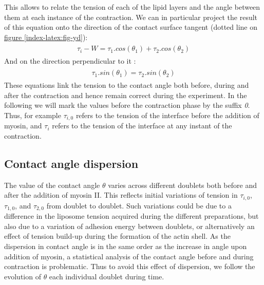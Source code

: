 \documentclass[A4paperpaper,11pt,english]{sphinxmanual}
\begin{document}
This allows
to relate the tension of each of the lipid layers and the angle
between them at each instance of the contraction. We can in particular project
the result of this equation onto the direction of the contact surface
tangent (dotted line on \hyperref[index-latex:fig-yd]{figure  \ref*{index-latex:fig-yd}}):
\label{index-latex:equation-young-tangent}\begin{gather}
\begin{split}\tau_i - W = \tau_1.cos(\theta_1) + \tau_2.cos(\theta_2)\end{split}\label{index-latex-young-tangent}
\end{gather}
And on the direction perpendicular to it :
\label{index-latex:equation-young-perpendicular}\begin{gather}
\begin{split} \tau_1.sin(\theta_1) = \tau_2.sin(\theta_2)\end{split}\label{index-latex-young-perpendicular}
\end{gather}
These equations link the tension to the contact angle both before, during and
after the contraction and hence remain correct during the experiment. In the following we will mark the values
before the contraction phase by
the suffix \emph{0}. Thus, for example \(\tau_{i,0}\) refers to the
tension of the interface before the addition of myosin, and \(\tau_i\) refers to the
tension of the interface at any instant of the contraction.


\subsection{Contact angle dispersion}
\label{index-latex:contact-angle-dispersion}
The value of the contact angle \(\theta\) varies across different doublets both before
and after the  addition of myosin II. This reflects initial variations of tension in
\(\tau_{i,0}\), \(\tau_{1,0}\), and \(\tau_{2,0}\) from doublet to doublet. Such variations could be
due to a difference in the liposome tension acquired during the different preparations, but also due to a
variation of adhesion energy between doublets, or alternatively an effect of tension build-up
during the formation of the actin shell. As the dispersion in contact angle is
in the same order as the increase in angle upon addition of myosin, a
statistical analysis of the contact angle before and during contraction is
problematic. Thus to avoid this effect of dispersion, we follow the evolution of
\(\theta\) each individual doublet during time.
\end{document}
